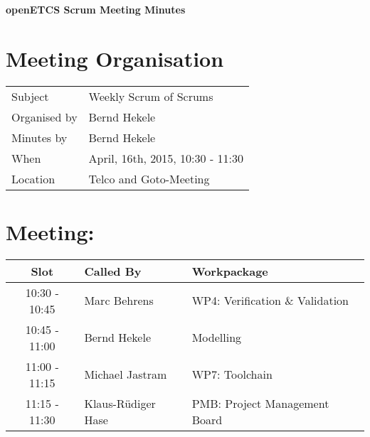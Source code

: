 \documentclass[a4paper, 11pt]{article}
\begin{document}
{\begin{center}\huge\bf openETCS Scrum Meeting Minutes\end{center}}
\section{Meeting Organisation}

\renewcommand{\arraystretch}{1.5}
\begin{supertabular}{m{.2\textwidth}m{.8\textwidth}}
Subject & Weekly Scrum of Scrums\\
Organised by &Bernd Hekele\\
Minutes by & Bernd Hekele\\
When & April, 16th, 2015, 10:30 - 11:30\\
Location & Telco and Goto-Meeting\\
\end{supertabular}

\renewcommand{\arraystretch}{1.0}
\section{Meeting:}

\begin{tabular}{|c|l|l|}
\hline
\textbf{Slot} &  \textbf{Called By} & \textbf{Workpackage} \\
\hline  
10:30 - 10:45 & Marc Behrens & WP4: Verification \& Validation \\\hline  
10:45 - 11:00 & Bernd Hekele & Modelling \\\hline  
11:00 - 11:15 & Michael Jastram  & WP7: Toolchain \\\hline
11:15 - 11:30 & Klaus-R\"udiger Hase & PMB: Project Management Board \\\hline  
\end{tabular}
\end{document}
